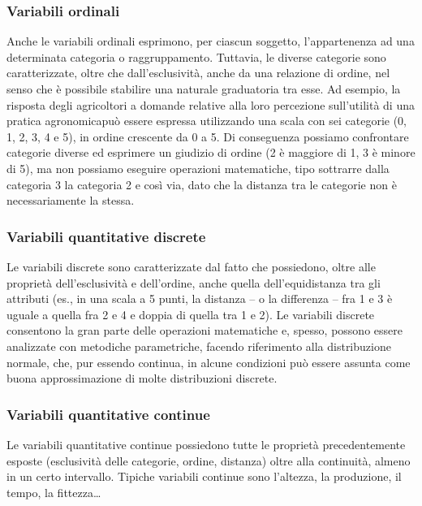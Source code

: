 \documentclass[a4paper,12pt,oneside]{book}
\begin{document}
\subsubsection{Variabili ordinali}\label{variabili-ordinali}

Anche le variabili ordinali esprimono, per ciascun soggetto,
l'appartenenza ad una determinata categoria o raggruppamento. Tuttavia,
le diverse categorie sono caratterizzate, oltre che dall'esclusività,
anche da una relazione di ordine, nel senso che è possibile stabilire
una naturale graduatoria tra esse. Ad esempio, la risposta degli
agricoltori a domande relative alla loro percezione sull'utilità di una
pratica agronomicapuò essere espressa utilizzando una scala con sei
categorie (0, 1, 2, 3, 4 e 5), in ordine crescente da 0 a 5. Di
conseguenza possiamo confrontare categorie diverse ed esprimere un
giudizio di ordine (2 è maggiore di 1, 3 è minore di 5), ma non possiamo
eseguire operazioni matematiche, tipo sottrarre dalla categoria 3 la
categoria 2 e così via, dato che la distanza tra le categorie non è
necessariamente la stessa.

\subsubsection{Variabili quantitative
discrete}\label{variabili-quantitative-discrete}

Le variabili discrete sono caratterizzate dal fatto che possiedono,
oltre alle proprietà dell'esclusività e dell'ordine, anche quella
dell'equidistanza tra gli attributi (es., in una scala a 5 punti, la
distanza -- o la differenza -- fra 1 e 3 è uguale a quella fra 2 e 4 e
doppia di quella tra 1 e 2). Le variabili discrete consentono la gran
parte delle operazioni matematiche e, spesso, possono essere analizzate
con metodiche parametriche, facendo riferimento alla distribuzione
normale, che, pur essendo continua, in alcune condizioni può essere
assunta come buona approssimazione di molte distribuzioni discrete.

\subsubsection{Variabili quantitative
continue}\label{variabili-quantitative-continue}

Le variabili quantitative continue possiedono tutte le proprietà
precedentemente esposte (esclusività delle categorie, ordine, distanza)
oltre alla continuità, almeno in un certo intervallo. Tipiche variabili
continue sono l'altezza, la produzione, il tempo, la fittezza\ldots{}
\end{document}

